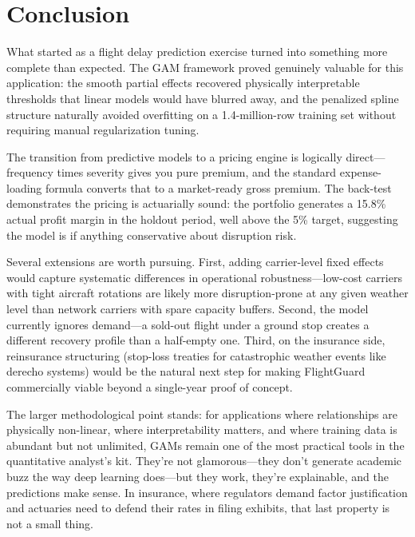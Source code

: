 \documentclass[12pt, a4paper]{article}
\begin{document}
\section{Conclusion}
\label{sec:conclusion}

What started as a flight delay prediction exercise turned into something more complete than expected. The GAM framework proved genuinely valuable for this application: the smooth partial effects recovered physically interpretable thresholds that linear models would have blurred away, and the penalized spline structure naturally avoided overfitting on a 1.4-million-row training set without requiring manual regularization tuning.

The transition from predictive models to a pricing engine is logically direct---frequency times severity gives you pure premium, and the standard expense-loading formula converts that to a market-ready gross premium. The back-test demonstrates the pricing is actuarially sound: the portfolio generates a 15.8\% actual profit margin in the holdout period, well above the 5\% target, suggesting the model is if anything conservative about disruption risk.

Several extensions are worth pursuing. First, adding carrier-level fixed effects would capture systematic differences in operational robustness---low-cost carriers with tight aircraft rotations are likely more disruption-prone at any given weather level than network carriers with spare capacity buffers. Second, the model currently ignores demand---a sold-out flight under a ground stop creates a different recovery profile than a half-empty one. Third, on the insurance side, reinsurance structuring (stop-loss treaties for catastrophic weather events like derecho systems) would be the natural next step for making FlightGuard commercially viable beyond a single-year proof of concept.

The larger methodological point stands: for applications where relationships are physically non-linear, where interpretability matters, and where training data is abundant but not unlimited, GAMs remain one of the most practical tools in the quantitative analyst's kit. They're not glamorous---they don't generate academic buzz the way deep learning does---but they work, they're explainable, and the predictions make sense. In insurance, where regulators demand factor justification and actuaries need to defend their rates in filing exhibits, that last property is not a small thing.
\end{document}
